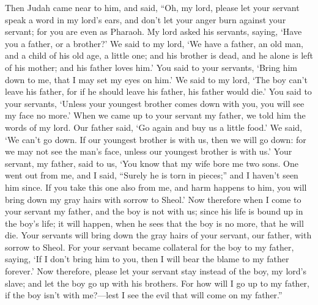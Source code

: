 {\par }{\PP {}Then Judah came near to him, and said, “Oh, my lord, please let your servant speak a word in my lord’s ears, and don’t let your anger burn against your servant; for you are even as Pharaoh.
My lord asked his servants, saying, ‘Have you a father, or a brother?’
We said to my lord, ‘We have a father, an old man, and a child of his old age, a little one; and his brother is dead, and he alone is left of his mother; and his father loves him.’
You said to your servants, ‘Bring him down to me, that I may set my eyes on him.’
We said to my lord, ‘The boy can’t leave his father, for if he should leave his father, his father would die.’
You said to your servants, ‘Unless your youngest brother comes down with you, you will see my face no more.’
When we came up to your servant my father, we told him the words of my lord.
Our father said, ‘Go again and buy us a little food.’
We said, ‘We can’t go down. If our youngest brother is with us, then we will go down: for we may not see the man’s face, unless our youngest brother is with us.’
Your servant, my father, said to us, ‘You know that my wife bore me two sons.
One went out from me, and I said, “Surely he is torn in pieces;” and I haven’t seen him since.
If you take this one also from me, and harm happens to him, you will bring down my gray hairs with sorrow to Sheol.’
Now therefore when I come to your servant my father, and the boy is not with us; since his life is bound up in the boy’s life;
it will happen, when he sees that the boy is no more, that he will die. Your servants will bring down the gray hairs of your servant, our father, with sorrow to Sheol.
For your servant became collateral for the boy to my father, saying, ‘If I don’t bring him to you, then I will bear the blame to my father forever.’
Now therefore, please let your servant stay instead of the boy, my lord’s slave; and let the boy go up with his brothers.
For how will I go up to my father, if the boy isn’t with me?—lest I see the evil that will come on my father.”

}
